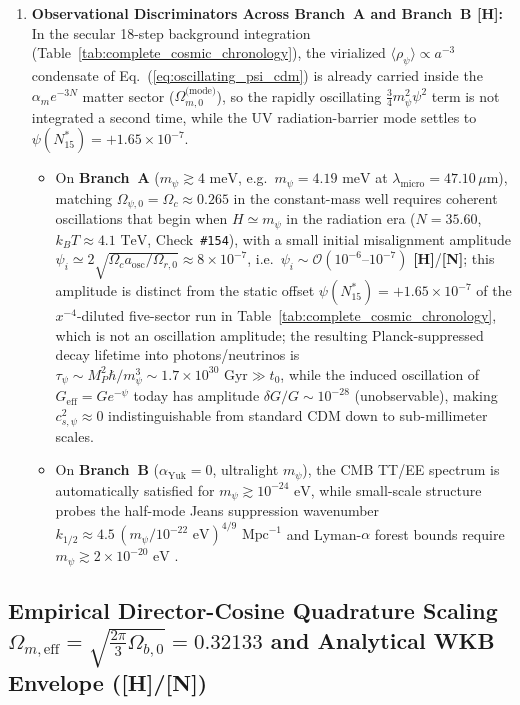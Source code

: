 \documentclass[11pt,a4paper]{article}
\newcommand{\catH}{\textbf{\textcolor{orange!85!black}{[H]}}}
\newcommand{\catN}{\textbf{\textcolor{teal!75!black}{[N]}}}
\theoremstyle{plain}
\theoremstyle{definition}
\theoremstyle{remark}
\numberwithin{equation}{section}
\begin{document}
\begin{enumerate}
  \item \textbf{Observational Discriminators Across Branch~A and Branch~B \catH:} In the secular 18-step background integration (Table~\ref{tab:complete_cosmic_chronology}), the virialized $\langle\rho_{\psi}\rangle \propto a^{-3}$ condensate of Eq.~(\ref{eq:oscillating_psi_cdm}) is already carried inside the $\alpha_m e^{-3N}$ matter sector ($\Omega_{m,0}^{\text{(mode)}}$), so the rapidly oscillating $\frac{3}{4}m_{\psi}^2\psi^2$ term is not integrated a second time, while the UV radiation-barrier mode settles to $\psi(N_{15}^*) = +1.65 \times 10^{-7}$.
  \begin{itemize}
    \item On \textbf{Branch~A} ($m_{\psi} \gtrsim 4\text{ meV}$, e.g.\ $m_{\psi} = 4.19\text{ meV}$ at $\lambda_{\text{micro}} = 47.10\,\mu\text{m}$), matching $\Omega_{\psi,0} = \Omega_c \approx 0.265$ in the constant-mass well requires coherent oscillations that begin when $H \simeq m_{\psi}$ in the radiation era ($N = 35.60$, $k_B T \approx 4.1\text{ TeV}$, Check~\texttt{\#154}), with a small initial misalignment amplitude $\psi_i \simeq 2\sqrt{\Omega_c a_{\text{osc}}/\Omega_{r,0}} \approx 8 \times 10^{-7}$, i.e.\ $\psi_i \sim \mathcal{O}(10^{-6}\text{--}10^{-7})$ \catH/\catN; this amplitude is distinct from the static offset $\psi(N_{15}^*) = +1.65 \times 10^{-7}$ of the $x^{-4}$-diluted five-sector run in Table~\ref{tab:complete_cosmic_chronology}, which is not an oscillation amplitude; the resulting Planck-suppressed decay lifetime into photons/neutrinos is $\tau_{\psi} \sim M_P^2\hbar / m_{\psi}^3 \sim 1.7 \times 10^{30}\text{ Gyr} \gg t_0$, while the induced oscillation of $G_{\text{eff}} = G e^{-\psi}$ today has amplitude $\delta G/G \sim 10^{-28}$ (unobservable), making $c_{s,\psi}^2 \approx 0$ indistinguishable from standard CDM down to sub-millimeter scales.
    \item On \textbf{Branch~B} ($\alpha_{\text{Yuk}} = 0$, ultralight $m_{\psi}$), the CMB TT/EE spectrum is automatically satisfied for $m_{\psi} \gtrsim 10^{-24}\text{ eV}$, while small-scale structure probes the half-mode Jeans suppression wavenumber $k_{1/2} \approx 4.5\,(m_{\psi}/10^{-22}\text{ eV})^{4/9}\text{ Mpc}^{-1}$ and Lyman-$\alpha$ forest bounds require $m_{\psi} \gtrsim 2 \times 10^{-20}\text{ eV}$ \cite{hlozek2015}.
  \end{itemize}
\end{enumerate}

\subsection{\texorpdfstring{Empirical Director-Cosine Quadrature Scaling $\Omega_{m,\text{eff}} = \sqrt{\frac{2\pi}{3}\Omega_{b,0}} = 0.32133$ and Analytical WKB Envelope (\catH/\catN)}{Empirical Director-Cosine Quadrature Scaling Omega_m,eff = 0.32133 and Analytical WKB Envelope ([H]/[N])}}
\end{document}
